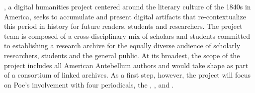 \projectname, a digital humanities project centered around the literary culture of the 1840s in America, seeks to accumulate and present digital artifacts that re-contextualize this period in history for future readers, students and researchers. The project team is composed of a cross-disciplinary mix of scholars and students committed to establishing a research archive for the equally diverse audience of scholarly researchers, students and the general public. At its broadest, the scope of the project includes all American Antebellum authors and would take shape as part of a consortium of linked archives. As a first step, however, the project will focus on Poe's involvement with four periodicals, the \bwj{}, \slm{}, \bgm{} and \gm{}.
